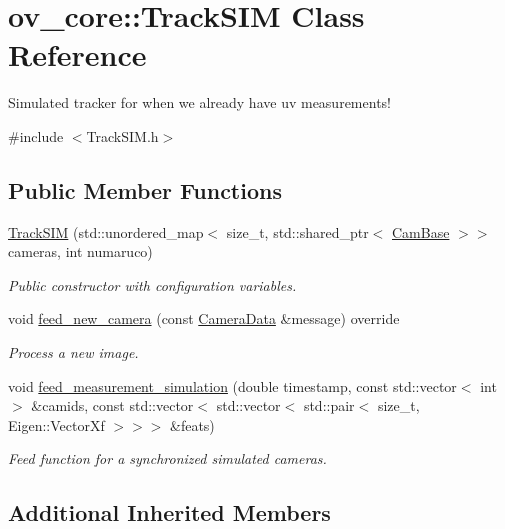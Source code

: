 \hypertarget{classov__core_1_1TrackSIM}{}\section{ov\+\_\+core\+:\+:Track\+S\+IM Class Reference}
\label{classov__core_1_1TrackSIM}


Simulated tracker for when we already have uv measurements!  




{\ttfamily \#include $<$Track\+S\+I\+M.\+h$>$}

\subsection*{Public Member Functions}
\begin{DoxyCompactItemize}
\item 
\hyperlink{classov__core_1_1TrackSIM_ac1b011188c7ec1af805b66bd5eaa29c8}{Track\+S\+IM} (std\+::unordered\+\_\+map$<$ size\+\_\+t, std\+::shared\+\_\+ptr$<$ \hyperlink{classov__core_1_1CamBase}{Cam\+Base} $>$$>$ cameras, int numaruco)
\begin{DoxyCompactList}\small\item\em Public constructor with configuration variables. \end{DoxyCompactList}\item 
void \hyperlink{classov__core_1_1TrackSIM_a4c1537c48eec664a2c83dacc4b7e5778}{feed\+\_\+new\+\_\+camera} (const \hyperlink{structov__core_1_1CameraData}{Camera\+Data} \&message) override
\begin{DoxyCompactList}\small\item\em Process a new image. \end{DoxyCompactList}\item 
void \hyperlink{classov__core_1_1TrackSIM_a00388c410c804854c4c91e1a392d44e0}{feed\+\_\+measurement\+\_\+simulation} (double timestamp, const std\+::vector$<$ int $>$ \&camids, const std\+::vector$<$ std\+::vector$<$ std\+::pair$<$ size\+\_\+t, Eigen\+::\+Vector\+Xf $>$$>$$>$ \&feats)
\begin{DoxyCompactList}\small\item\em Feed function for a synchronized simulated cameras. \end{DoxyCompactList}\end{DoxyCompactItemize}
\subsection*{Additional Inherited Members}


